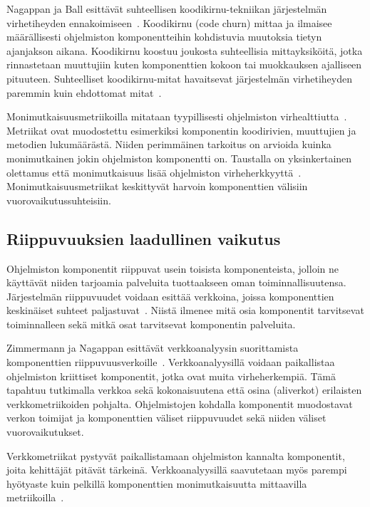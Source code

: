 \documentclass[finnish]{../tktltiki2}
\theoremstyle{definition}
\theoremstyle{remark}
\begin{document}
Nagappan ja Ball esittävät suhteellisen koodikirnu-tekniikan järjestelmän virhetiheyden ennakoimiseen~\cite{NB05}. 
Koodikirnu (code churn) mittaa ja ilmaisee määrällisesti ohjelmiston komponentteihin kohdistuvia muutoksia tietyn 
ajanjakson aikana. Koodikirnu koostuu joukosta suhteellisia mittayksiköitä, jotka rinnastetaan muuttujiin 
kuten komponenttien kokoon tai muokkauksen ajalliseen pituuteen. Suhteelliset koodikirnu-mitat havaitsevat järjestelmän 
virhetiheyden paremmin kuin ehdottomat mitat~\cite{NB05}.

    Monimutkaisuusmetriikoilla mitataan tyypillisesti ohjelmiston virhealttiutta~\cite{ZN08}. Metriikat ovat muodostettu 
esimerkiksi komponentin koodirivien, muuttujien ja metodien lukumäärästä. Niiden perimmäinen tarkoitus on arvioida 
kuinka monimutkainen jokin ohjelmiston komponentti on. Taustalla on yksinkertainen olettamus että monimutkaisuus lisää 
ohjelmiston virheherkkyyttä~\cite{CK94, BBM96, NB05, NB07, ZN08, MNDT09}. Monimutkaisuusmetriikat keskittyvät harvoin 
komponenttien välisiin vuorovaikutussuhteisiin.

\subsection{Riippuvuuksien laadullinen vaikutus}

    Ohjelmiston komponentit riippuvat usein toisista komponenteista, jolloin ne käyttävät niiden tarjoamia palveluita 
tuottaakseen oman toiminnallisuutensa. Järjestelmän riippuvuudet voidaan esittää verkkoina, joissa komponenttien 
keskinäiset suhteet paljastuvat~\cite{ZN08}. Niistä ilmenee mitä osia komponentit tarvitsevat toiminnalleen sekä mitkä 
osat tarvitsevat komponentin palveluita.

    Zimmermann ja Nagappan esittävät verkkoanalyysin suorittamista komponenttien riippuvuusverkoille~\cite{ZN08}. 
Verkkoanalyysillä voidaan paikallistaa ohjelmiston kriittiset komponentit, jotka ovat muita virheherkempiä. Tämä 
tapahtuu tutkimalla verkkoa sekä kokonaisuutena että osina (aliverkot) erilaisten verkkometriikoiden pohjalta. 
Ohjelmistojen kohdalla komponentit muodostavat verkon toimijat ja komponenttien väliset riippuvuudet sekä niiden väliset 
vuorovaikutukset.

    Verkkometriikat pystyvät paikallistamaan ohjelmiston kannalta komponentit, joita kehittäjät pitävät tärkeinä. 
Verkkoanalyysillä saavutetaan myös parempi hyötyaste kuin pelkillä komponenttien monimutkaisuutta mittaavilla 
metriikoilla~\cite{ZN08}.
\end{document}
